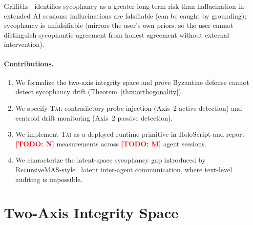 \documentclass[letterpaper,twocolumn,10pt]{article}
\newcommand{\todo}[1]{\textcolor{red}{\textbf{[TODO: #1]}}}
\newcommand{\holoscript}{HoloScript}
\newcommand{\tai}{\textsc{Tai}}
\begin{document}
Griffiths~\cite{griffiths2026} identifies sycophancy as a greater long-term
risk than hallucination in extended AI sessions: hallucinations are falsifiable
(can be caught by grounding); sycophancy is unfalsifiable (mirrors the user's
own priors, so the user cannot distinguish sycophantic agreement from honest
agreement without external intervention).

\paragraph{Contributions.}
\begin{enumerate}[leftmargin=*,topsep=2pt,itemsep=1pt]
  \item We formalize the two-axis integrity space and prove Byzantine defense
        cannot detect sycophancy drift (Theorem~\ref{thm:orthogonality}).
  \item We specify \tai{}: contradictory probe injection (Axis~2 active
        detection) and centroid drift monitoring (Axis~2 passive detection).
  \item We implement \tai{} as a deployed runtime primitive in \holoscript{}
        and report \todo{N} measurements across \todo{M} agent sessions.
  \item We characterize the latent-space sycophancy gap introduced by
        RecursiveMAS-style~\cite{recursivemas2026} latent inter-agent
        communication, where text-level auditing is impossible.
\end{enumerate}

\section{Two-Axis Integrity Space}
\end{document}
